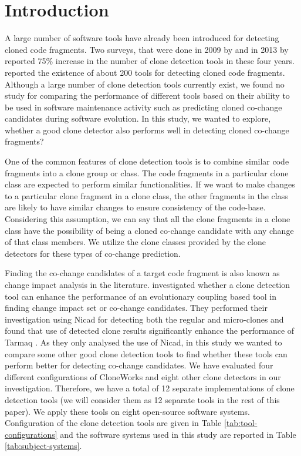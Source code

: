 \documentclass[review]{elsarticle}
\begin{document}
\linenumbers

\section{Introduction}
\label{the-introduction}
A large number of software tools have already been introduced for detecting cloned code fragments. Two surveys, that were done in 2009 by \citet{Roy09comparisonand} and in 2013 by \citet{journals/infsof/RattanBS13} reported 75\% increase in the number of clone detection tools in these four years. \citet{BigCloneBenchCKRoyJRCordy} reported the existence of about 200 tools for detecting cloned code fragments. Although a large number of clone detection tools currently exist, we found no study for comparing the performance of different tools based on their ability to be used in software maintenance activity such as predicting cloned co-change candidates during software evolution. In this study, we wanted to explore, whether a good clone detector also performs well in detecting cloned co-change fragments? %

One of the common features of clone detection tools is to combine similar code fragments into a clone group or class. The code fragments in a particular clone class are expected to perform similar functionalities. If we want to make changes to a particular clone fragment in a clone class, the other fragments in the class are likely to have similar changes to ensure consistency of the code-base. Considering this assumption, we can say that all the clone fragments in a clone class have the possibility of being a cloned co-change candidate with any change of that class members. We utilize the clone classes provided by the clone detectors for these types of co-change prediction.

Finding the co-change candidates of a target code fragment is also known as change impact analysis \cite{book-change-impact} in the literature.  \citet{Mondal:Association:Rules} investigated whether a clone detection tool can enhance the performance of an evolutionary coupling based tool in finding change impact set or co-change candidates. They performed their investigation using Nicad for detecting both the regular and micro-clones and found that use of detected clone results significantly enhance the performance of Tarmaq \citet{TarmaqChangeImpact}. As they only analysed the use of Nicad, in this study we wanted to compare some other good clone detection tools to find whether these tools can perform better for detecting co-change candidates. We have evaluated four different configurations of CloneWorks \cite{CloneWorks-Jeff} and eight other clone detectors in our investigation. Therefore, we have a total of 12 separate implementations of clone detection tools (we will consider them as 12 separate tools in the rest of this paper).  We apply these tools on eight open-source software systems. Configuration of the clone detection tools are given in Table \ref{tab:tool-configurations} and the software systems used in this study are reported in Table \ref{tab:subject-systems}.
\end{document}
